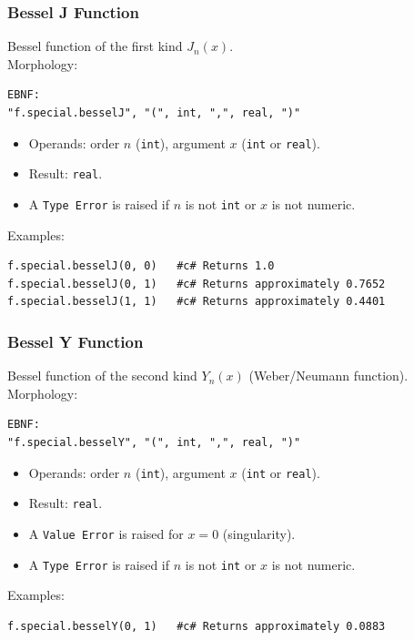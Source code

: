 \subsubsection{Bessel J Function}
Bessel function of the first kind $J_n(x)$. \\
Morphology:
\begin{verbatim}
EBNF:
"f.special.besselJ", "(", int, ",", real, ")"
\end{verbatim}
\begin{itemize}
\item Operands: order $n$ (\texttt{int}), argument $x$ (\texttt{int} or \texttt{real}).
\item Result: \texttt{real}.
\item A \texttt{Type Error} is raised if $n$ is not \texttt{int} or $x$ is not numeric.
\end{itemize}
Examples:
\begin{verbatim}
f.special.besselJ(0, 0)   #c# Returns 1.0
f.special.besselJ(0, 1)   #c# Returns approximately 0.7652
f.special.besselJ(1, 1)   #c# Returns approximately 0.4401
\end{verbatim}

\subsubsection{Bessel Y Function}
Bessel function of the second kind $Y_n(x)$ (Weber/Neumann function). \\
Morphology:
\begin{verbatim}
EBNF:
"f.special.besselY", "(", int, ",", real, ")"
\end{verbatim}
\begin{itemize}
\item Operands: order $n$ (\texttt{int}), argument $x$ (\texttt{int} or \texttt{real}).
\item Result: \texttt{real}.
\item A \texttt{Value Error} is raised for $x = 0$ (singularity).
\item A \texttt{Type Error} is raised if $n$ is not \texttt{int} or $x$ is not numeric.
\end{itemize}
Examples:
\begin{verbatim}
f.special.besselY(0, 1)   #c# Returns approximately 0.0883
\end{verbatim}

